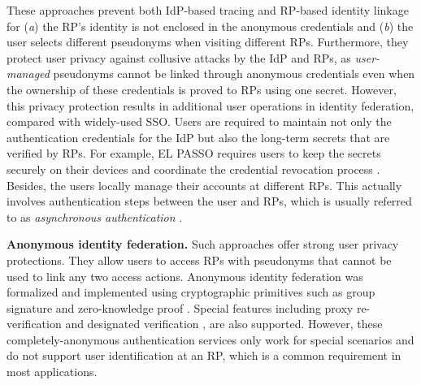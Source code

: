 These approaches prevent both IdP-based tracing and RP-based identity linkage for (\emph{a}) the RP's identity is not enclosed in the anonymous credentials and (\emph{b}) the user selects different pseudonyms when visiting different RPs.
Furthermore, they protect user privacy against collusive attacks by the IdP and RPs, as \emph{user-managed} pseudonyms cannot be linked through anonymous credentials \cite{anon-credential-2001, idemix, anon-credential} even when the ownership of these credentials is proved to RPs using one secret.
However, this privacy protection results in additional user operations in identity federation, compared with widely-used SSO.
Users are required to maintain not only the authentication credentials for the IdP but also the long-term secrets that are verified by RPs.
For example, EL PASSO \cite{ELPASSO} requires users to keep the secrets securely on their devices and coordinate the credential revocation process \cite{ELPASSO, UnlimitID}.
Besides, the users locally manage their accounts at different RPs. This actually involves authentication steps between the user and RPs, which is usually referred to as \emph{asynchronous authentication} \cite{ELPASSO}.


\noindent\textbf{Anonymous identity federation.}
Such approaches offer strong user privacy protections. They allow users to access RPs with pseudonyms that cannot be used to link any two access actions.
Anonymous identity federation was formalized \cite{WangWS13} and implemented using cryptographic primitives such as group signature and zero-knowledge proof \cite{WangWS13, HanCSTWW20, HanCSTW18}. Special features including proxy re-verification \cite{HanCSTWW20} and designated verification \cite{HanCSTW18}, are also supported. %
However, these completely-anonymous authentication services only work for special scenarios and do not support user identification at an RP, which is a common requirement in most applications.
